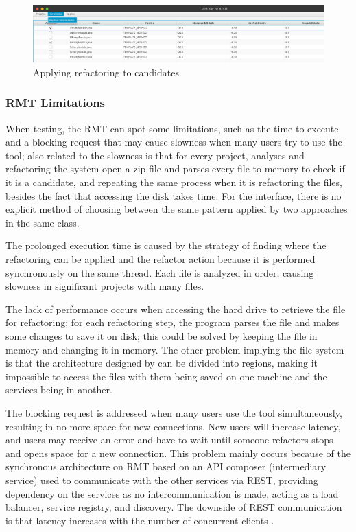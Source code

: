 \begin{figure}[ht!]
\SetCaptionWidth{\textwidth}
\caption{Applying refactoring to candidates}
\label{fig-refactor}
\includegraphics[width =\textwidth]{Chapter-2/Figures/refactor.png}
\end{figure}
\FloatBarrier

\subsubsection{RMT Limitations}
\label{subsub-limitation}
When testing, the RMT can spot some limitations, such as the time to execute and a blocking request that may cause slowness when many users try to use the tool; also related to the slowness is that for every project, analyses and refactoring the system open a zip file and parses every file to memory to check if it is a candidate, and repeating the same process when it is refactoring the files, besides the fact that accessing the disk takes time. For the interface, there is no explicit method of choosing between the same pattern applied by two approaches in the same class.

The prolonged execution time is caused by the strategy of finding where the refactoring can be applied and the refactor action because it is performed synchronously on the same thread. Each file is analyzed in order, causing slowness in significant projects with many files.

The lack of performance occurs when accessing the hard drive to retrieve the file for refactoring; for each refactoring step, the program parses the file and makes some changes to save it on disk; this could be solved by keeping the file in memory and changing it in memory.
The other problem implying the file system is that the architecture designed by \textcite{beluzzo2018abordagem} can be divided into regions, making it impossible to access the files with them being saved on one machine and the services being in another.

The blocking request is addressed when many users use the tool simultaneously, resulting in no more space for new connections. New users will increase latency, and users may receive an error and have to wait until someone refactors stops and opens space for a new connection. This problem mainly occurs because of the synchronous architecture on RMT based on an API composer (intermediary service) used to communicate with the other services via REST, providing dependency on the services as no intercommunication is made, acting as a load balancer, service registry, and discovery. The downside of REST communication is that latency increases with the number of concurrent clients \cite{Cebeci2020DesignOA}. 

